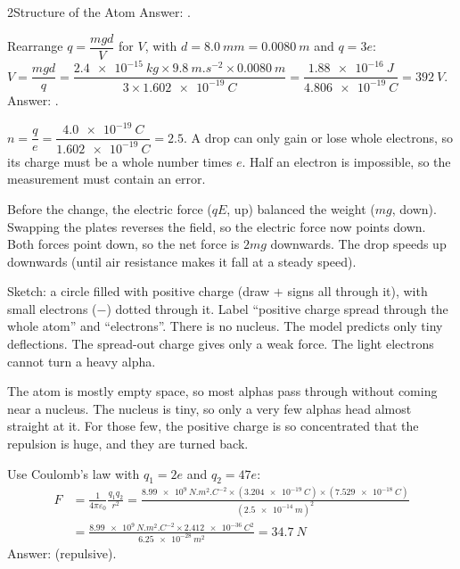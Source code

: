 \begin{chapteranswers}{2}{Structure of the Atom}
        Answer: .
  \item Rearrange $q = \dfrac{mgd}{V}$ for $V$, with $d = \qty{8.0}{mm} = \qty{0.0080}{m}$
        and $q = 3e$:
        $V = \dfrac{mgd}{q} = \dfrac{\qty{2.4e-15}{kg}\times\qty{9.8}{m.s^{-2}}\times\qty{0.0080}{m}}{3\times\qty{1.602e-19}{C}}
        = \dfrac{\qty{1.88e-16}{J}}{\qty{4.806e-19}{C}} = \qty{392}{V}$.
        Answer: .
  \item $n = \dfrac{q}{e} = \dfrac{\qty{4.0e-19}{C}}{\qty{1.602e-19}{C}} = 2.5$.
        A drop can only gain or lose whole electrons, so its charge must be a
        whole number times $e$. Half an electron is impossible, so the
        measurement must contain an error.
  \item Before the change, the electric force ($qE$, up) balanced the weight
        ($mg$, down). Swapping the plates reverses the field, so the electric
        force now points down. Both forces point down, so the net force is
        $2mg$ downwards. The drop speeds up downwards (until air resistance
        makes it fall at a steady speed).
  \item Sketch: a circle filled with positive charge (draw $+$ signs all
        through it), with small electrons ($-$) dotted through it. Label
        ``positive charge spread through the whole atom'' and ``electrons''.
        There is no nucleus. The model predicts only tiny deflections. The
        spread-out charge gives only a weak force. The light electrons cannot
        turn a heavy alpha.
  \item The atom is mostly empty space, so most alphas pass through without
        coming near a nucleus. The nucleus is tiny, so only a very few alphas
        head almost straight at it. For those few, the positive charge is so
        concentrated that the repulsion is huge, and they are turned back.
  \item Use Coulomb's law with $q_1 = 2e$ and $q_2 = 47e$:
        \begin{align*}
          F &= \frac{1}{4\pi\varepsilon_0}\frac{q_1 q_2}{r^2}
          = \frac{\qty{8.99e9}{N.m^2.C^{-2}}\times(\qty{3.204e-19}{C})\times(\qty{7.529e-18}{C})}{(\qty{2.5e-14}{m})^2}\\
          &= \frac{\qty{8.99e9}{N.m^2.C^{-2}}\times\qty{2.412e-36}{C^2}}{\qty{6.25e-28}{m^2}}
          = \qty{34.7}{N}
        \end{align*}
        Answer:  (repulsive).

\end{chapteranswers}
